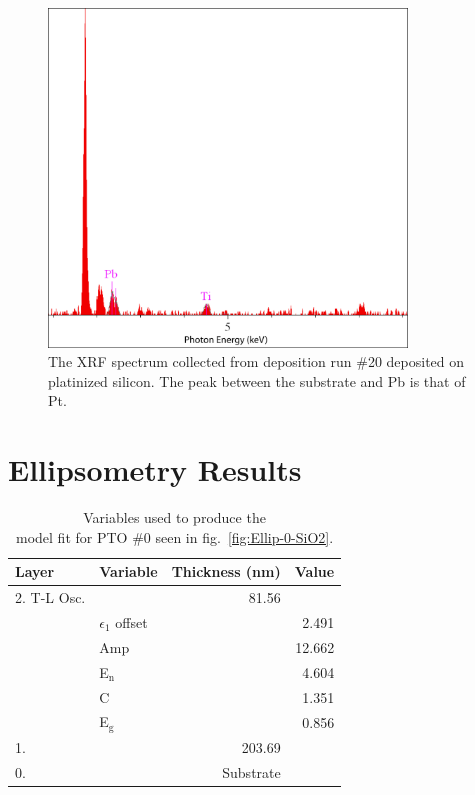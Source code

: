 \begin{figure}[htbp]
	\centering
	\includegraphics[width=0.85\textwidth]{./Figures/Appendix/Composition/PTO-run20-pt.png}
	\caption[XRF Spectrum of PTO \#20 on Pt-Si]%
		     {The XRF spectrum collected from deposition run \#20 deposited on platinized silicon. The peak between the substrate and Pb is that of Pt. }
	\label{fig:XRF-20-Pt}
\end{figure}

\clearpage

\section{Ellipsometry Results}
\label{sup:Ellipsometry}

\begin{table}[htbp]
	\centering
	\caption[PTO \#0 Ellipsometric Model Variables]{Variables used to produce the\\model fit for PTO \#0 seen in fig.~\vref{fig:Ellip-0-SiO2}. \label{tbl:PTO-0-ellip-variables}}
	\begin{tabular}{l l r r}
	\toprule
	Layer&Variable&Thickness (nm)&Value\\
	\midrule
	2. T-L Osc.&&81.56&\\
	&$\epsilon_{1}$ offset&&2.491\\
	&Amp&&12.662\\
	&E$_{\mathrm{n}}$&&4.604\\
	&C&&1.351\\
	&E$_{\mathrm{g}}$&&0.856\\
	1. \ce{SiO2}&&203.69&\\
	0. \ce{Si}&&Substrate&\\
	\bottomrule
	\end{tabular}
\end{table}

